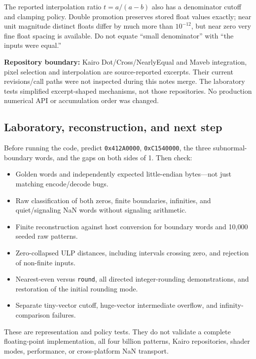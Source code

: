 The reported interpolation ratio \(t=a/(a-b)\) also has a denominator cutoff and clamping policy. Double promotion preserves stored float values exactly; near unit magnitude distinct floats differ by much more than \(10^{-12}\), but near zero very fine float spacing is available. Do not equate ``small denominator'' with ``the inputs were equal.''

\textbf{Repository boundary:} Kairo Dot/Cross/NearlyEqual and Maveb integration, pixel selection and interpolation are source-reported excerpts. Their current revisions/call paths were not inspected during this notes merge. The laboratory tests simplified excerpt-shaped mechanisms, not those repositories. No production numerical API or accumulation order was changed.

\subsection{Laboratory, reconstruction, and next step}\label{01-foundations-i-ch001-laboratory-reconstruction-and-next-step}

Before running the code, predict \texttt{0x412A0000}, \texttt{0xC1540000}, the three subnormal-boundary words, and the gaps on both sides of 1. Then check:

\begin{itemize}
\tightlist
\item
  Golden words and independently expected little-endian bytes---not just matching encode/decode bugs.
\item
  Raw classification of both zeros, finite boundaries, infinities, and quiet/signaling NaN words without signaling arithmetic.
\item
  Finite reconstruction against host conversion for boundary words and 10,000 seeded raw patterns.
\item
  Zero-collapsed ULP distances, including intervals crossing zero, and rejection of non-finite inputs.
\item
  Nearest-even versus \texttt{round}, all directed integer-rounding demonstrations, and restoration of the initial rounding mode.
\item
  Separate tiny-vector cutoff, huge-vector intermediate overflow, and infinity-comparison failures.
\end{itemize}

These are representation and policy tests. They do not validate a complete floating-point implementation, all four billion patterns, Kairo repositories, shader modes, performance, or cross-platform NaN transport.

